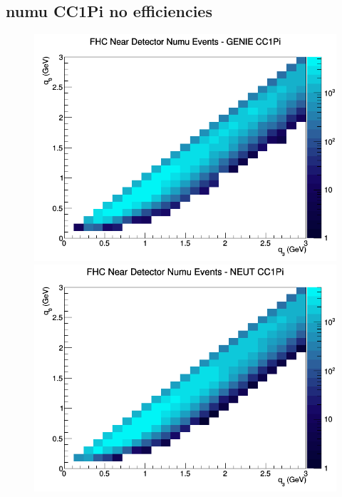\subsection{numu CC1Pi no efficiencies}
\begin{figure}[h]
\includegraphics[width=\linewidth]{q0_q3/nominal/CC1Pi_FHC_ND_numu_q3_q0_GENIE.png}
\endminipage
{}
\includegraphics[width=\linewidth]{q0_q3/nominal/CC1Pi_FHC_ND_numu_q3_q0_NEUT.png}
\endminipage
{}

\end{figure}
